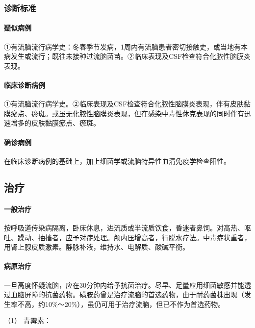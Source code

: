 \subsubsection{诊断标准}

\paragraph{疑似病例}

①有流脑流行病学史：冬春季节发病，1周内有流脑患者密切接触史，或当地有本病发生或流行；既往未接种过流脑菌苗。②临床表现及CSF检查符合化脓性脑膜炎表现。

\paragraph{临床诊断病例}

①有流脑流行病学史。②临床表现及CSF检查符合化脓性脑膜炎表现，伴有皮肤黏膜瘀点、瘀斑。或虽无化脓性脑膜炎表现，但在感染中毒性休克表现的同时伴有迅速增多的皮肤黏膜瘀点、瘀斑。

\paragraph{确诊病例}

在临床诊断病例的基础上，加上细菌学或流脑特异性血清免疫学检查阳性。

\subsection{治疗}

\paragraph{一般治疗}

按呼吸道传染病隔离，卧床休息，进流质或半流质饮食，昏迷者鼻饲。对高热、呕吐、躁动、抽搐者，应予对症处理。颅内压增高者，行脱水疗法。中毒症状重者，用肾上腺皮质激素。静脉补液，维持水、电解质、酸碱平衡。

\paragraph{病原治疗}

一旦高度怀疑流脑，应在30分钟内给予抗菌治疗。尽早、足量应用细菌敏感并能透过血脑屏障的抗菌药物。磺胺药曾是治疗流脑的首选药物，由于耐药菌株出现（发生率不高，约10\%～20\%），虽仍可用于治疗流脑，但已不作为首选药物。

\hypertarget{text00231.htmlux5cux23CHP7-11-3-2-1}{}
（1） 青霉素：

